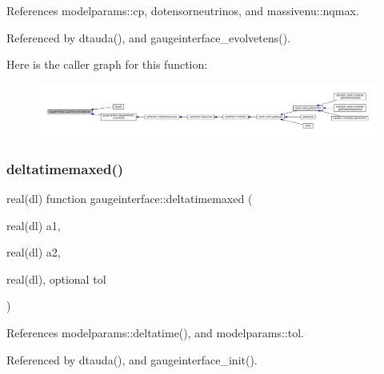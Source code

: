 References modelparams\+::cp, dotensorneutrinos, and massivenu\+::nqmax.



Referenced by dtauda(), and gaugeinterface\+\_\+evolvetens().

Here is the caller graph for this function\+:
\nopagebreak
\begin{figure}[H]
\begin{center}
\leavevmode
\includegraphics[width=350pt]{namespacegaugeinterface_ab306d2378bd6f559471a11afc145621c_icgraph}
\end{center}
\end{figure}
\mbox{\label{namespacegaugeinterface_aaf1e4804f8b140406e78f53f199433fa}} 
\subsubsection{\texorpdfstring{deltatimemaxed()}{deltatimemaxed()}}
{\footnotesize\ttfamily real(dl) function gaugeinterface\+::deltatimemaxed (\begin{DoxyParamCaption}\item[{real(dl)}]{a1,  }\item[{real(dl)}]{a2,  }\item[{real(dl), optional}]{tol }\end{DoxyParamCaption})}



References modelparams\+::deltatime(), and modelparams\+::tol.



Referenced by dtauda(), and gaugeinterface\+\_\+init().

